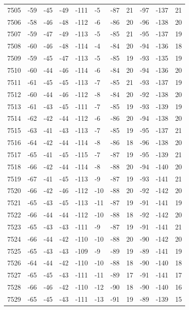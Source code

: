 \begin{table}[H]
\begin{tabular}{lllllllllll}
7505 & -59 & -45 & -49 & -111 & -5 & -87 & 21 & -97 & -137 & 21 \\
7506 & -58 & -46 & -48 & -112 & -6 & -86 & 20 & -96 & -138 & 20 \\
7507 & -59 & -47 & -49 & -113 & -5 & -85 & 21 & -95 & -137 & 19 \\
7508 & -60 & -46 & -48 & -114 & -4 & -84 & 20 & -94 & -136 & 18 \\
7509 & -59 & -45 & -47 & -113 & -5 & -85 & 19 & -93 & -135 & 19 \\
7510 & -60 & -44 & -46 & -114 & -6 & -84 & 20 & -94 & -136 & 20 \\
7511 & -61 & -45 & -45 & -113 & -7 & -85 & 21 & -93 & -137 & 19 \\
7512 & -60 & -44 & -46 & -112 & -8 & -84 & 20 & -92 & -138 & 20 \\
7513 & -61 & -43 & -45 & -111 & -7 & -85 & 19 & -93 & -139 & 19 \\
7514 & -62 & -42 & -44 & -112 & -6 & -86 & 20 & -94 & -138 & 20 \\
7515 & -63 & -41 & -43 & -113 & -7 & -85 & 19 & -95 & -137 & 21 \\
7516 & -64 & -42 & -44 & -114 & -8 & -86 & 18 & -96 & -138 & 20 \\
7517 & -65 & -41 & -45 & -115 & -7 & -87 & 19 & -95 & -139 & 21 \\
7518 & -66 & -42 & -44 & -114 & -8 & -88 & 20 & -94 & -140 & 20 \\
7519 & -67 & -41 & -45 & -113 & -9 & -87 & 19 & -93 & -141 & 21 \\
7520 & -66 & -42 & -46 & -112 & -10 & -88 & 20 & -92 & -142 & 20 \\
7521 & -65 & -43 & -45 & -113 & -11 & -87 & 19 & -91 & -141 & 19 \\
7522 & -66 & -44 & -44 & -112 & -10 & -88 & 18 & -92 & -142 & 20 \\
7523 & -65 & -43 & -43 & -111 & -9 & -87 & 19 & -91 & -141 & 21 \\
7524 & -66 & -44 & -42 & -110 & -10 & -88 & 20 & -90 & -142 & 20 \\
7525 & -65 & -43 & -43 & -109 & -9 & -89 & 19 & -89 & -141 & 19 \\
7526 & -64 & -44 & -42 & -110 & -10 & -88 & 18 & -90 & -140 & 18 \\
7527 & -65 & -45 & -43 & -111 & -11 & -89 & 17 & -91 & -141 & 17 \\
7528 & -66 & -46 & -42 & -110 & -12 & -90 & 18 & -90 & -140 & 16 \\
7529 & -65 & -45 & -43 & -111 & -13 & -91 & 19 & -89 & -139 & 15 \\

\end{tabular}
\end{table}
